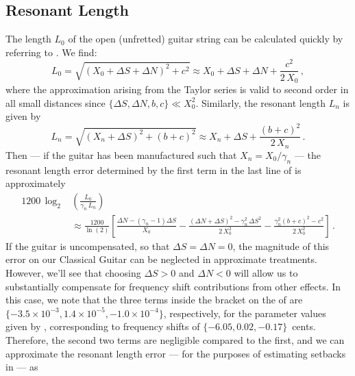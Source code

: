  \subsection{Resonant Length}
The length $L_0$ of the open (unfretted) guitar string can be calculated quickly by referring to . We find:
 \begin{equation}  \label{eqn:l_0_def}
L_0 = \sqrt{\left(X_0 + \Delta S + \Delta N\right)^2 + c^2} \approx X_0 + \Delta S + \Delta N + \frac{c^2}{2\, X_0}\, ,
 \end{equation}
where the approximation arising from the Taylor series is valid to second order in all small distances since $\{\Delta S, \Delta N, b, c\} \ll X_0^2$. Similarly, the resonant length $L_n$ is given by
 \begin{equation}  \label{eqn:l_n_def}
L_n = \sqrt{\left(X_n + \Delta S\right)^2 + (b + c)^2} \approx X_n + \Delta S + \frac{(b + c)^2}{2\, X_n}\, .
 \end{equation}
Then --- if the guitar has been manufactured such that $X_n = X_0 / \gamma_n$ --- the resonant length error determined by the first term in the last line of  is approximately
\begin{equation} \label{eqn:rle_taylor}
  \begin{split}
    1200\, \log_2& \left( \frac{L_0}{\gamma_n\, L_n} \right) \\
    & \approx \frac{1200}{\ln(2)} \left[ \frac{\Delta N - \left(\gamma_n - 1\right) \Delta S}{X_0} - \frac{(\Delta N + \Delta S)^2 - \gamma_n^2\, \Delta S^2}{2\, X_0^2} - \frac{\gamma_n^2 (b + c)^2 - c^2}{2\, X_0^2}\right]\, .
  \end{split}
\end{equation}
If the guitar is uncompensated, so that $\Delta S = \Delta N = 0$, the magnitude of this error on our Classical Guitar can be neglected in approximate treatments. However, we'll see that choosing $\Delta S > 0$ and $\Delta N < 0$ will allow us to substantially compensate for frequency shift contributions from other effects. In this case, we note that the three terms inside the bracket on the \rhs of  are $\{-3.5 \times 10^{-3}, 1.4 \times 10^{-5}, -1.0 \times 10^{-4}\}$, respectively, for the parameter values given by , corresponding to frequency shifts of $\{-6.05, 0.02, -0.17\}$~cents. Therefore, the second two terms are negligible compared to the first, and we can approximate the resonant length error --- for the purposes of estimating setbacks in  --- as

